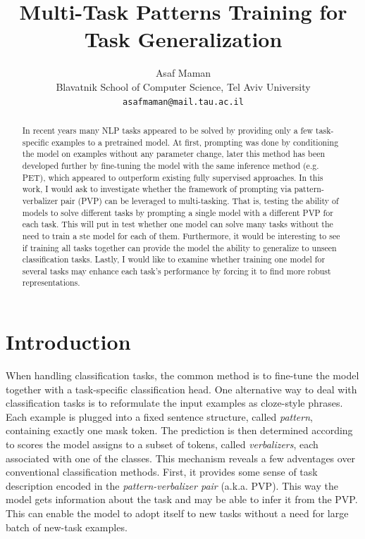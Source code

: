 \documentclass[11pt,a4paper]{article}
\title{Multi-Task Patterns Training for Task Generalization}
\author{Asaf Maman \\
  Blavatnik School of Computer Science, Tel Aviv University \\
  \texttt{asafmaman@mail.tau.ac.il} \\}
\date{}
\begin{document}
\maketitle
\begin{abstract}
In recent years many NLP tasks appeared to be solved by providing only a few task-specific examples to a pretrained model.
At first, prompting was done by conditioning the model on examples without any parameter change, later this method has been developed further by fine-tuning the model with the same inference method (e.g. PET), which appeared to outperform existing fully supervised approaches.
In this work, I would ask to investigate whether the framework of prompting via pattern-verbalizer pair (PVP) can be leveraged to multi-tasking.
That is, testing the ability of models to solve different tasks by prompting a single model with a different PVP for each task. This will put in test whether one model can solve many tasks without the need to train a ste model for each of them.
Furthermore, it would be interesting to see if training all tasks together can provide the model the ability to generalize to unseen classification tasks.
Lastly, I would like to examine whether training one model for several tasks may enhance each task's performance by forcing it to find more robust representations.
\end{abstract}


\section{Introduction}

When handling classification tasks, the common method is to fine-tune the model together with a task-specific classification head.
One alternative way to deal with classification tasks is to reformulate the input examples as cloze-style phrases.
Each example is plugged into a fixed sentence structure, called \textit{pattern}, containing exactly one mask token.
The prediction is then determined according to scores the model assigns to a subset of tokens, called \textit{verbalizers}, each associated with one of the classes.
This mechanism reveals a few adventages over conventional classification methods.
First, it provides some sense of task description encoded in the \textit{pattern-verbalizer pair} (a.k.a. PVP).
This way the model gets information about the task and may be able to infer it from the PVP.
This can enable the model to adopt itself to new tasks without a need for large batch of new-task examples.
\end{document}
